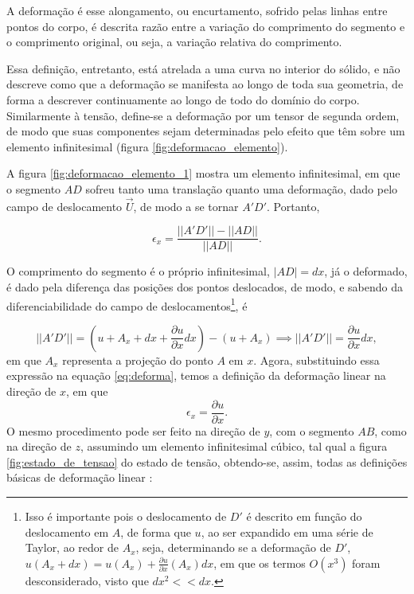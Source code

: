 A deformação é esse alongamento, ou encurtamento, sofrido pelas linhas entre pontos do corpo, é descrita razão entre a variação do comprimento do segmento e o comprimento original, ou seja, a variação relativa do comprimento.  

Essa definição, entretanto, está atrelada a uma curva no interior do sólido, e não descreve como que a deformação se manifesta ao longo de toda sua geometria, de forma a descrever continuamente ao longo de todo do domínio do corpo. Similarmente à tensão, define-se a deformação por um tensor de segunda ordem, de modo que suas componentes sejam determinadas pelo efeito que têm sobre um elemento infinitesimal (figura \ref{fig:deformacao_elemento}). \cite[pág. 230]{lub}

A figura \ref{fig:deformacao_elemento_1} mostra um elemento infinitesimal, em que o segmento $AD$ sofreu tanto uma translação quanto uma deformação, dado pelo campo de deslocamento $\vec{U}$, de modo a se tornar $A'D'$. Portanto,

\begin{equation}
    \epsilon_x = \frac{||A'D'|| - ||AD||}{||AD||}.
    \label{eq:deforma}
\end{equation}



O comprimento do segmento é o próprio infinitesimal, $|AD| = dx$, já o deformado, é dado pela diferença das posições dos pontos deslocados, de modo, e sabendo da diferenciabilidade do campo de deslocamentos\footnote{Isso é importante pois o deslocamento de $D'$ é descrito em função do deslocamento em $A$, de forma que $u$, ao ser expandido em uma série de Taylor, ao redor de $A_x$, seja, determinando se a deformação de $D'$, $u(A_x + dx) = u(A_x) + \frac{\partial u}{\partial x}(A_x) dx$, em que os termos $O(x^3)$ foram desconsiderado, visto que $dx^2 << dx$.}, é

\begin{equation}
    ||A'D'|| = (u + A_x + dx + \frac{\partial u}{\partial x} dx) - (u + A_x) \implies ||A'D'|| = \frac{\partial u}{\partial x} dx,
\end{equation}
em que $A_x$ representa a projeção do ponto $A$ em $x$.
Agora, substituindo essa expressão na equação \ref{eq:deforma}, temos a definição da deformação linear na direção de $x$, em que
\begin{equation}
    \epsilon_x = \frac{\partial u}{\partial x}.
\end{equation}
O mesmo procedimento pode ser feito na direção de $y$, com o segmento $AB$, como na direção de $z$, assumindo um elemento infinitesimal cúbico, tal qual a figura \ref{fig:estado_de_tensao} do estado de tensão, obtendo-se, assim, todas as definições básicas de deformação linear \cite{popov}:

